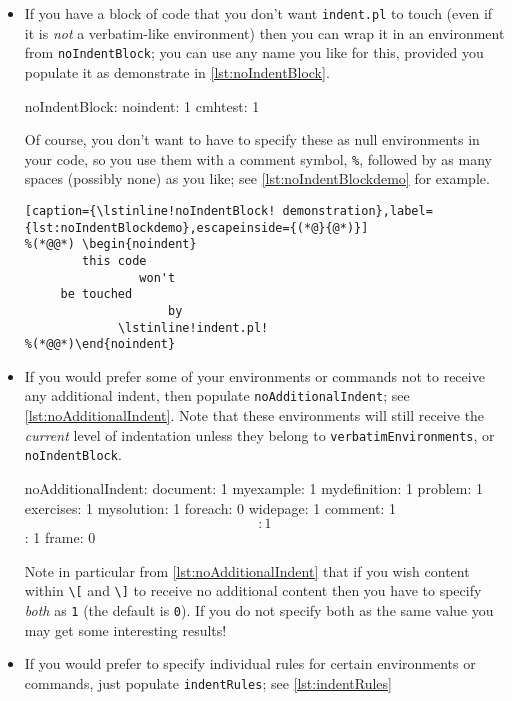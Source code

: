 \begin{itemize}
	\item[\verbitem{noIndentBlock}] If you have a block of code that you don't 
	want \lstinline!indent.pl! to touch (even if it is \emph{not} a verbatim-like
	environment) then you can wrap it in an environment from \lstinline!noIndentBlock!;
	you can use any name you like for this, provided you populate it as demonstrate in 
	\cref{lst:noIndentBlock}.
						 		 		 		 		 					
	\begin{yaml}[caption={\lstinline!noIndentBlock!},label={lst:noIndentBlock}]
noIndentBlock:
    noindent: 1
    cmhtest: 1
	\end{yaml}
						 		 		 		 		 					
	Of course, you don't want to have to specify these as null environments
	in your code, so you use them with a comment symbol, \lstinline!%!, followed 
	by as many spaces (possibly none) as you like; see \cref{lst:noIndentBlockdemo} for 
	example.
	\begin{lstlisting}[caption={\lstinline!noIndentBlock! demonstration},label={lst:noIndentBlockdemo},escapeinside={(*@}{@*)}]
%(*@@*) \begin{noindent} 
        this code
                won't 
     be touched
                    by 
             \lstinline!indent.pl!
%(*@@*)\end{noindent} 
	\end{lstlisting}
						 		 		 		 		 					
	\item[\verbitem{noAdditionalIndent}] If you would prefer some of your
	environments or commands not to receive any additional indent, then 
	populate \lstinline!noAdditionalIndent!; see \cref{lst:noAdditionalIndent}. 
	Note that these environments will still receive the \emph{current} level
	of indentation unless they belong to \lstinline!verbatimEnvironments!, or \lstinline!noIndentBlock!.
						 		 		 		 		 					
	\begin{yaml}[caption={\lstinline!noAdditionalIndent!},label={lst:noAdditionalIndent}]
noAdditionalIndent:
    document: 1
    myexample: 1
    mydefinition: 1
    problem: 1
    exercises: 1
    mysolution: 1
    foreach: 0
    widepage: 1
    comment: 1
    \[: 1
    \]: 1
    frame: 0
	\end{yaml}
	Note in particular from \cref{lst:noAdditionalIndent} that if you wish content within 
	\lstinline!\[!  and \lstinline!\]! to receive no additional content then 
	you have to specify \emph{both} as \lstinline!1! (the default is \lstinline!0!). 
	If you do not specify both as the same value you may get some interesting results!
	\item[\verbitem{indentRules}] If\label{page:indentRules} you would prefer to specify 
	individual rules for certain environments or commands, just
	populate \lstinline!indentRules!; see \cref{lst:indentRules}
						 		 		 		 		 					

\end{itemize}
